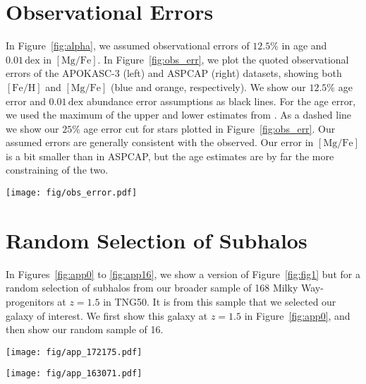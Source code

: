 \documentclass[twocolumn]{aastex631}
\newcommand{\FeH}{\ensuremath{[\textrm{Fe}/\textrm{H}]}}
\newcommand{\MgFe}{\ensuremath{[\textrm{Mg}/\textrm{Fe}]}}
\newcommand{\dex}{\ensuremath{\textrm{dex}}}
\begin{document}
\section{Observational Errors}\label{app:obs_err}
In Figure~\ref{fig:alpha}, we assumed observational errors of $12.5\%$ in age and $0.01\,\dex$ in \MgFe{}. In Figure~\ref{fig:obs_err}, we plot the quoted observational errors of the APOKASC-3 (left) and ASPCAP (right) datasets, showing both \FeH{} and \MgFe{} (blue and orange, respectively). We show our $12.5\%$ age error and $0.01\,\dex$ abundance error assumptions as black lines. For the age error, we used the maximum of the upper and lower estimates from \citet{2018ApJS..239...32P}. As a dashed line we show our $25\%$ age error cut for stars plotted in Figure~\ref{fig:obs_err}. Our assumed errors are generally consistent with the observed. Our error in \MgFe{} is a bit smaller than in ASPCAP, but the age estimates are by far the more constraining of the two.

\begin{figure*}
  \centering
  \texttt{[image: fig/obs\_error.pdf]}
  \caption{The observational errors of the APOKASC-3 (left) and ASPCAP dataset (right). We show, on the left, a line indicating a $12.5\%$ error in observed age and on the right a vertical line indicating a $0.01\,\dex$ error. On the left, a dashed line indicates the $25\%$ error cut used for inclusion in Figure~\ref{fig:alpha}.}
  \label{fig:obs_err}
\end{figure*}

\section{Random Selection of Subhalos}\label{app:rand_fig1}
In Figures~\ref{fig:app0} to \ref{fig:app16}, we show a version of Figure~\ref{fig:fig1} but for a random selection of subhalos from our broader sample of 168 Milky Way-progenitors at $z=1.5$ in TNG50. It is from this sample that we selected our galaxy of interest. We first show this galaxy at $z=1.5$ in Figure~\ref{fig:app0}, and then show our random sample of 16.

\begin{figure*}
  \centering
  \texttt{[image: fig/app\_172175.pdf]}
  \caption{The same as Figure~\ref{fig:fig1}, but for our galaxy of interest at $z=1.5$.}
  \label{fig:app0}
\end{figure*}

\begin{figure*}
  \centering
  \texttt{[image: fig/app\_163071.pdf]}
  \caption{The same as Figure~\ref{fig:fig1}, but for a random subhalo from our catalog at $z=1.5$.}
  \label{fig:app1}
\end{figure*}
\end{document}
